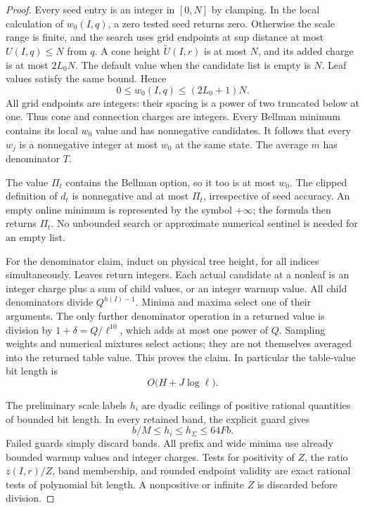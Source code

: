 \begin{proof}
Every seed entry is an integer in $[0,N]$ by clamping.  In the local
calculation of $w_0(I,q)$, a zero tested seed returns zero.  Otherwise
the scale range is finite, and the search uses grid endpoints at
sup distance at most $U(I,q)\le N$ from $q$.  A cone height
$\widetilde U(I,r)$ is at most $N$, and its added charge is at most
$2L_0N$.  The default value when the candidate list is empty is $N$.
Leaf values satisfy the same bound.  Hence
\[
 0\le w_0(I,q)\le(2L_0+1)N.
\]
All grid endpoints are integers: their spacing is a power of two
truncated below at one.  Thus cone and connection charges are
integers.  Every Bellman minimum contains its local $w_0$ value and
has nonnegative candidates.  It follows that every $w_j$ is a
nonnegative integer at most $w_0$ at the same state.  The average
$m$ has denominator $T$.

The value $\Pi_t$ contains the Bellman option, so it too is at most
$w_0$.  The clipped definition of $d_t$ is nonnegative and at most
$\Pi_t$, irrespective of seed accuracy.  An empty online minimum
is represented by the symbol $+\infty$; the formula then returns
$\Pi_t$.  No unbounded search or approximate numerical sentinel is
needed for an empty list.

For the denominator claim, induct on physical tree height, for all
indices simultaneously.  Leaves return integers.  Each actual
candidate at a nonleaf is an integer charge plus a sum of child
values, or an integer warmup value.  All child denominators divide
$Q^{h(I)-1}$.  Minima and maxima select one of their arguments.  The
only further denominator operation in a returned value is division
by $1+\delta=Q/\ell^{10}$, which adds at most one power of $Q$.
Sampling weights and numerical mixtures select actions; they are
not themselves averaged into the returned table value.  This proves
the claim.  In particular the table-value bit length is
\[
 O\bigl(H+J\log\ell\bigr).
\]

The preliminary scale labels $h_i$ are dyadic ceilings of positive
rational quantities of bounded bit length.  In every retained band,
the explicit guard gives
\[
 b/M\le h_i\le h_\Sigma\le64Fb.
\]
Failed guards simply discard bands.  All prefix and wide minima
use already bounded warmup values and integer charges.  Tests for
positivity of $Z$, the ratio $z(I,r)/Z$, band membership, and rounded
endpoint validity are exact rational tests of polynomial bit
length.  A nonpositive or infinite $Z$ is discarded before division.


\end{proof}
